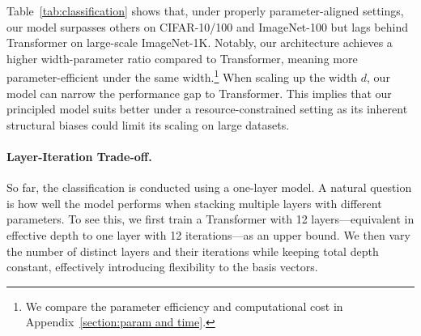 \begin{table}[htbp]
\caption{Top-1 accuracy ($\%$) for image classification with single-layer recurrent-depth models. Parameters are measured on ImageNet-1K. All models are trained from scratch on the listed datasets.}
\label{tab:classification}
\centering
{}
\end{table}

Table~\ref{tab:classification} shows that, under properly parameter-aligned settings, our model surpasses others on CIFAR-10/100 and ImageNet-100 but lags behind Transformer on large-scale ImageNet-1K. Notably, our architecture achieves a higher width-parameter ratio compared to Transformer, meaning more parameter-efficient under the same width.\footnote{We compare the parameter efficiency and computational cost in Appendix~\ref{section:param and time}.} When scaling up the width $d$, our model can narrow the performance gap to Transformer. This implies that our principled model suits better under a resource-constrained setting as its inherent structural biases could limit its scaling on large datasets.

\paragraph{Layer-Iteration Trade-off.}
So far, the classification is conducted using a one-layer model. A natural question is how well the model performs when stacking multiple layers with different parameters. To see this, we first train a Transformer with 12 layers—equivalent in effective depth to one layer with 12 iterations—as an upper bound. We then vary the number of distinct layers and their iterations while keeping total depth constant, effectively introducing flexibility to the basis vectors. 

